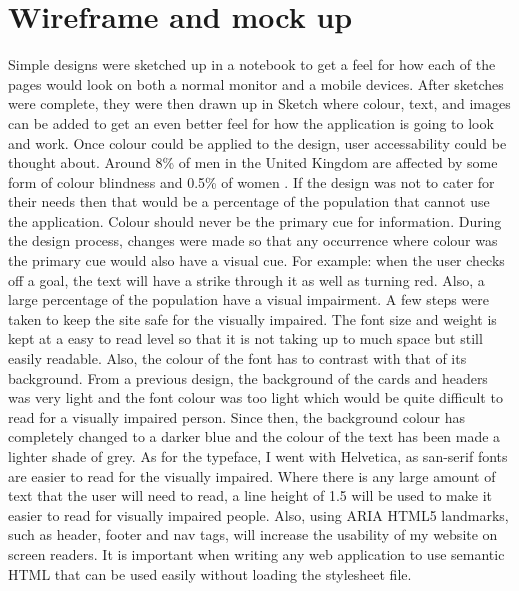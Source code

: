 \section{Wireframe and mock up}
Simple designs were sketched up in a notebook to get a feel for how each of the pages would look on both a normal monitor and a mobile devices. After sketches were complete, they were then drawn up in Sketch \citep{sketch:2013} where colour, text, and images can be added to get an even better feel for how the application is going to look and work. Once colour could be applied to the design, user accessability could be thought about. Around 8\% of men in the United Kingdom are affected by some form of colour blindness and 0.5\% of women \citep{colourBlind}. If the design was not to cater for their needs then that would be a percentage of the population that cannot use the application. Colour should never be the primary cue for information. During the design process, changes were made so that any occurrence where colour was the primary cue would also have a visual cue. For example: when the user checks off a goal, the text will have a strike through it as well as turning red. Also, a large percentage of the population have a visual impairment. A few steps were taken to keep the site safe for the visually impaired. The font size and weight is kept at a easy to read level so that it is not taking up to much space but still easily readable. Also, the colour of the font has to contrast with that of its background. From a previous design, the background of the cards and headers was very light and the font colour was too light which would be quite difficult to read for a visually impaired person. Since then, the background colour has completely changed to a darker blue and the colour of the text has been made a lighter shade of grey. As for the typeface, I went with Helvetica, as san-serif fonts are easier to read for the visually impaired. Where there is any large amount of text that the user will need to read, a line height of 1.5 will be used to make it easier to read for visually impaired people. Also, using ARIA HTML5 landmarks, such as header, footer and nav tags, will increase the usability of my website on screen readers. It is important when writing any web application to use semantic HTML that can be used easily without loading the stylesheet file.\\

